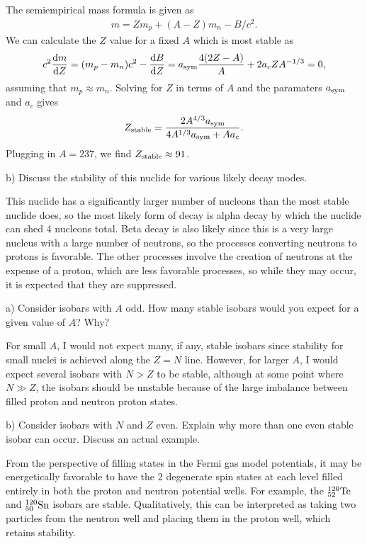 The semiempirical mass formula is given as
\begin{eqnarray}
    m = Zm_{p} + (A - Z)m_{n} - B/c^2
.\end{eqnarray}
We can calculate the $Z$ value for a fixed $A$ which is most stable as
\begin{eqnarray}
    c^2\dv{m}{Z} = (m_{p} - m_{n})c^2 - \dv{B}{Z} = a_{\rm sym} \frac{4(2Z - A)}{A} + 2a_{c} Z A^{-1/3} = 0
,\end{eqnarray}
assuming that $m_{p} \approx m_{n}$.
Solving for $Z$ in terms of $A$ and the paramaters $a_{\rm sym}$ and $a_{c}$ gives
\begin{eqnarray}
    Z_{\rm stable} = \frac{2A^{4/3}a_{\rm sym}}{4 A^{1/3}a_{\rm sym} + A a_{c}}
.\end{eqnarray}
Plugging in $A = 237$, we find $Z_{\rm stable} \approx 91$.


b) Discuss the stability of this nuclide for various likely decay modes.

This nuclide has a significantly larger number of nucleons than the most stable nuclide does, so the most likely form of decay is alpha decay by which the nuclide can shed 4 nucleons total.
Beta decay is also likely since this is a very large nucleus with a large number of neutrons, so the processes converting neutrons to protons is favorable.
The other processes involve the creation of neutrons at the expense of a proton, which are less favorable processes, so while they may occur, it is expected that they are suppressed.




a) Consider isobars with $A$ odd.
How many stable isobars would you expect for a given value of $A$?
Why?

For small $A$, I would not expect many, if any, stable isobars since stability for small nuclei is achieved along the $Z = N$ line.
However, for larger $A$, I would expect several isobars with $N > Z$ to be stable, although at some point where $N \gg Z$, the isobars should be unstable because of the large imbalance between filled proton and neutron proton states.

b) Consider isobars with $N$ and $Z$ even.
Explain why more than one even stable isobar can occur.
Discuss an actual example.

From the perspective of filling states in the Fermi gas model potentials, it may be energetically favorable to have the 2 degenerate spin states at each level filled entirely in both the proton and neutron potential wells.
For example, the $^{120}_{52}{\rm Te}$ and $^{120}_{50}{\rm Sn}$ isobars are stable. 
Qualitatively, this can be interpreted as taking two particles from the neutron well and placing them in the proton well, which retains stability.



